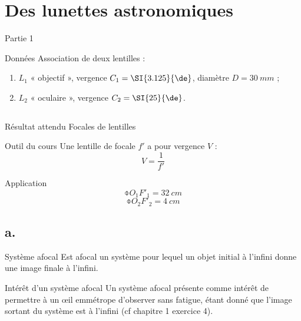 \documentclass[../main/main.tex]{subfiles}
\begin{document}
\section{Des lunettes astronomiques}
\begin{center}
    \huge Partie 1
\end{center}

\pagebreak

\begin{NCdefi}{Données}
    Association de deux lentilles :
    \begin{enumerate}
        \item $L_1$ « objectif », vergence $C_1 = \SI{3.125}{\de}$, diamètre $D
            = \SI{30}{mm}$ ;
        \item $L_2$ « oculaire », vergence $C_2 = \SI{25}{\de}$.
    \end{enumerate}
\end{NCdefi}

\subsection{}

\begin{NCprop}{Résultat attendu}
    Focales de lentilles
\end{NCprop}

\begin{NCdemo}{Outil du cours}
    Une lentille de focale $f'$ a pour vergence $V$ :
    \[ V = \frac{1}{f'} \]
\end{NCdemo}

\begin{NCexem}{Application}
    \[ \boxed{\obar{O_1F'_1} = \SI{32}{cm}} \]
    \[ \boxed{\obar{O_2F'_2} = \SI{4}{cm}} \]
\end{NCexem}

\subsection{a.}
\begin{defi}{Système afocal}
    Est afocal un système pour lequel un objet initial à l'infini donne une
    image finale à l'infini.
\end{defi}

\begin{inte}{Intérêt d'un système afocal}
    Un système afocal présente comme intérêt de permettre à un œil emmétrope
    d'observer sans fatigue, étant donné que l'image sortant du système est à
    l'infini (cf chapitre 1 exercice 4).
\end{inte}
\end{document}
